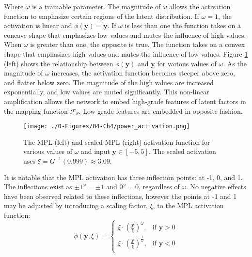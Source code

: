 Where $\omega$ is a trainable parameter. The magnitude of $\omega$ allows the activation function to emphasize certain regions of the latent distribution. If $\omega = 1$, the activation is linear and $\phi \left( \mathbf{y} \right)=\mathbf{y}$. If $\omega$ is less than one the function takes on a concave shape that emphasizes low values and mutes the influence of high values. When $\omega$ is greater than one, the opposite is true. The function takes on a convex shape that emphasizes high values and mutes the influence of low values. Figure \ref{fig:power_activation} (left) shows the relationship between $\phi \left( \mathbf{y} \right)$ and $\mathbf{y}$ for various values of $\omega$. As the magnitude of $\omega$ increases, the activation function becomes steeper above zero, and flatter below zero. The magnitude of the high values are increased exponentially, and low values are muted significantly. This non-linear amplification allows the network to embed high-grade features of latent factors in the mapping function $\mathcal{F}_{\theta}$. Low grade features are embedded in opposite fashion.

\begin{figure}[htb!]
    \centering
    \texttt{[image: ./0-Figures/04-Ch4/power\_activation.png]}
    \caption{The \gls{MPL} (left) and scaled \gls{MPL} (right) activation function for various values of $\omega$ and input $\mathbf{y} \in [-5,5]$. The scaled activation uses $\xi = G^{-1}(0.999) \approx 3.09$. }
    \label{fig:power_activation}
\end{figure}

It is notable that the \gls{MPL} activation has three inflection points: at -1, 0, and 1. The inflections exist as $\pm 1^{\omega} = \pm 1$ and $0^{\omega} = 0$, regardless of $\omega$. No negative effects have been observed related to these inflections, however the points at -1 and 1 may be adjusted by introducing a scaling factor, $\xi$, to the \gls{MPL} activation function:
\begin{equation}
    \phi \left( \mathbf{y}, \xi \right) =
    \begin{cases}
        \xi \cdot \left(\frac{\mathbf{y}}{\xi}\right)^{\omega},           & \text{if $\mathbf{y} > 0$} \\
        \xi \cdot \left(\frac{\mathbf{y}}{\xi}\right)^{\frac{1}{\omega}}, & \text{if $\mathbf{y} < 0$} \\
    \end{cases}
    \label{eq:power_scale}
\end{equation}

